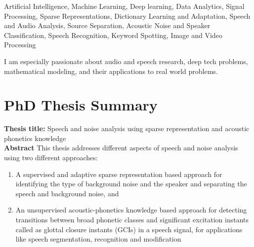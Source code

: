 \documentclass[line]{resume}
\begin{document}
{\begin{resume}
			 Artificial Intelligence, Machine Learning, Deep learning, Data Analytics, Signal Processing,  Sparse Representations, Dictionary Learning and Adaptation, Speech and Audio Analysis, Source Separation, Acoustic Noise and Speaker Classification,  Speech Recognition, Keyword Spotting, Image and Video  Processing
			\vspace{-.1cm}
			
			I am especially passionate about audio and speech research, deep tech problems, mathematical modeling,  and their applications to real world problems.
      	\section{\mysidestyle PhD Thesis Summary}
      	
      	\textbf{Thesis title:} Speech and noise analysis using sparse representation and acoustic phonetics knowledge\\	
			\noindent\textbf{Abstract}  This thesis  addresses  different  aspects of speech and noise analysis using two different approaches:\vspace{-.5cm}
			\begin{enumerate}
				\item  A supervised and adaptive sparse representation based approach for identifying the type of background noise and the speaker and separating the speech and background noise, and
				\item An unsupervised acoustic-phonetics knowledge  based approach for detecting transitions between broad phonetic classes  and significant excitation instants called as glottal closure instants (GCIs) in a speech signal, for applications like speech segmentation, recognition and modification
			\end{enumerate} 
			
			
			
			
			

\end{resume}}
\end{document}
